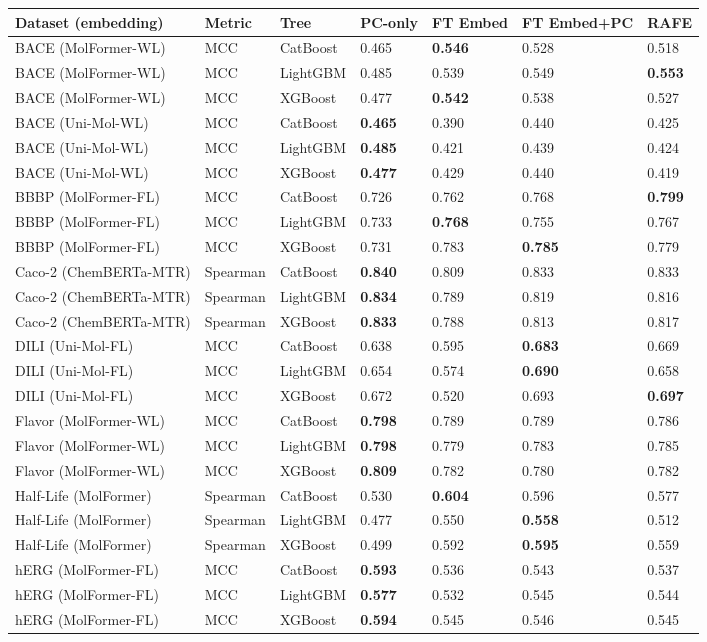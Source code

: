 \begin{tabular}{lllllll}
\toprule
Dataset (embedding) & Metric & Tree & PC-only & FT Embed & FT Embed+PC & RAFE \\
\midrule
BACE (MolFormer-WL) & MCC & CatBoost & 0.465 & \textbf{0.546} & 0.528 & 0.518 \\
BACE (MolFormer-WL) & MCC & LightGBM & 0.485 & 0.539 & 0.549 & \textbf{0.553} \\
BACE (MolFormer-WL) & MCC & XGBoost & 0.477 & \textbf{0.542} & 0.538 & 0.527 \\
BACE (Uni-Mol-WL) & MCC & CatBoost & \textbf{0.465} & 0.390 & 0.440 & 0.425 \\
BACE (Uni-Mol-WL) & MCC & LightGBM & \textbf{0.485} & 0.421 & 0.439 & 0.424 \\
BACE (Uni-Mol-WL) & MCC & XGBoost & \textbf{0.477} & 0.429 & 0.440 & 0.419 \\
BBBP (MolFormer-FL) & MCC & CatBoost & 0.726 & 0.762 & 0.768 & \textbf{0.799} \\
BBBP (MolFormer-FL) & MCC & LightGBM & 0.733 & \textbf{0.768} & 0.755 & 0.767 \\
BBBP (MolFormer-FL) & MCC & XGBoost & 0.731 & 0.783 & \textbf{0.785} & 0.779 \\
Caco-2 (ChemBERTa-MTR) & Spearman & CatBoost & \textbf{0.840} & 0.809 & 0.833 & 0.833 \\
Caco-2 (ChemBERTa-MTR) & Spearman & LightGBM & \textbf{0.834} & 0.789 & 0.819 & 0.816 \\
Caco-2 (ChemBERTa-MTR) & Spearman & XGBoost & \textbf{0.833} & 0.788 & 0.813 & 0.817 \\
DILI (Uni-Mol-FL) & MCC & CatBoost & 0.638 & 0.595 & \textbf{0.683} & 0.669 \\
DILI (Uni-Mol-FL) & MCC & LightGBM & 0.654 & 0.574 & \textbf{0.690} & 0.658 \\
DILI (Uni-Mol-FL) & MCC & XGBoost & 0.672 & 0.520 & 0.693 & \textbf{0.697} \\
Flavor (MolFormer-WL) & MCC & CatBoost & \textbf{0.798} & 0.789 & 0.789 & 0.786 \\
Flavor (MolFormer-WL) & MCC & LightGBM & \textbf{0.798} & 0.779 & 0.783 & 0.785 \\
Flavor (MolFormer-WL) & MCC & XGBoost & \textbf{0.809} & 0.782 & 0.780 & 0.782 \\
Half-Life (MolFormer) & Spearman & CatBoost & 0.530 & \textbf{0.604} & 0.596 & 0.577 \\
Half-Life (MolFormer) & Spearman & LightGBM & 0.477 & 0.550 & \textbf{0.558} & 0.512 \\
Half-Life (MolFormer) & Spearman & XGBoost & 0.499 & 0.592 & \textbf{0.595} & 0.559 \\
hERG (MolFormer-FL) & MCC & CatBoost & \textbf{0.593} & 0.536 & 0.543 & 0.537 \\
hERG (MolFormer-FL) & MCC & LightGBM & \textbf{0.577} & 0.532 & 0.545 & 0.544 \\
hERG (MolFormer-FL) & MCC & XGBoost & \textbf{0.594} & 0.545 & 0.546 & 0.545 \\
\bottomrule
\end{tabular}
